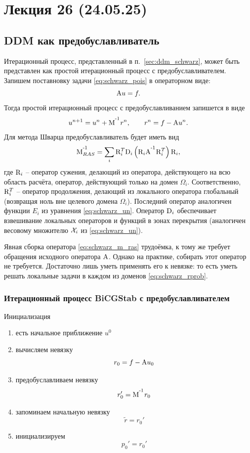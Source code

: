 \section{Лекция 26 (24.05.25)}

\subsection{DDM как предобуславливатель}
Итерационный процесс, представленный в п.~\ref{sec:ddm_schwarz},
может быть представлен как простой итерационный процесс с предобуславливателем.
Запишем поставновку задачи \cref{eq:schwarz_pois} в операторном виде:
\begin{equation}
\label{eq:schwarz_full_oper}
{\rm A} u = f.
\end{equation}
Тогда простой итерационный процесс с предобуславливанием запишется в виде
\begin{equation}
\label{eq:schwarz_simple_it}
u^{n+1} = u^{n} + {\rm M}^{\textsuperscript {-1}} r^{n}, \qquad r^n = f - {\rm A}u^n.
\end{equation}
Для метода Шварца предобуславливатель будет иметь вид
\begin{equation}
\label{eq:schwarz_m_ras}
{\rm M}^{\textsuperscript {-1}}_{RAS} = \sum_i {\rm R}^T_i {\rm D}_i \left( {\rm R}_i {\rm A}^{\textsuperscript {-1}} {\rm R}_i^T \right) {\rm R}_i,
\end{equation}
где ${\rm R}_i$ -- оператор сужения, делающий из оператора, действующего на всю область расчёта, оператор, действующий только на домен $\Omega_i$.
Соответственно, ${\rm R}^T_i$ -- оператор продолжения, делающий из локального оператора глобальный (возвращая ноль вне целевого домена $\Omega_i$).
Последний оператор аналогичен функции $E_i$ из уравнения \cref{eq:schwarz_un}.
Оператор ${\rm D}_i$ обеспечивает взвешивание локальных операторов и функций в зонах перекрытия (аналогичен весовому множителю $\mathcal{X}_i$ из \cref{eq:schwarz_un}).

Явная сборка оператора \cref{eq:schwarz_m_ras} трудоёмка, к тому же требует обращения исходного оператора ${\rm A}$.
Однако на практике, собирать этот оператор не требуется. Достаточно лишь уметь применять его к невязке: то
есть уметь решать локальные задачи в каждом из доменов \cref{eq:schwarz_rprob}.

\subsubsection{Итерационный процесс BiCGStab с предобуславливателем}
\label{sec:schwarz_bicgstab}

Инициализация
\begin{enumerate}
\item есть начальное приближение $u^0$
\item вычисляем невязку
$$r_0 = f - {\rm A} u_0$$
\item предобуславливаем невязку
$$r_0' = {\rm M}^{\textsuperscript {-1}}r_0$$
\item запоминаем начальную невязку
$$\tilde r = r_0'$$
\item инициализируем
$$p_0' = r_0'$$
\end{enumerate}

